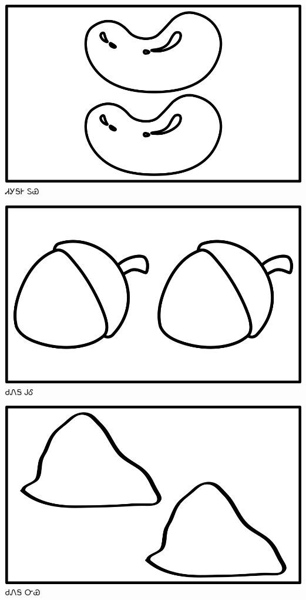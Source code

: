\documentclass[avery5371]{flashcards}%
\begin{document}
\begin{flashcard}{
\includegraphics[width=0.95\columnwidth,height=.51\columnwidth,keepaspectratio]{../artwork/objects-neutral/tali-tuya}
}\Huge ᏗᎩᎦᎨ ᏚᏯ
\end{flashcard}

\begin{flashcard}{
\includegraphics[width=0.95\columnwidth,height=.51\columnwidth,keepaspectratio]{../artwork/objects-neutral/tali-gule}
}\Huge ᏧᏁᎦ ᎫᎴ
\end{flashcard}

\begin{flashcard}{
\includegraphics[width=0.95\columnwidth,height=.51\columnwidth,keepaspectratio]{../artwork/objects-neutral/tali-nvya}
}\Huge ᏧᏁᎦ ᏅᏯ
\end{flashcard}
\end{document}
